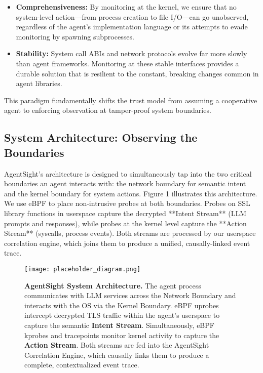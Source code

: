 \begin{itemize}
    \item \textbf{Comprehensiveness:} By monitoring at the kernel, we ensure that no system-level action—from process creation to file I/O—can go unobserved, regardless of the agent's implementation language or its attempts to evade monitoring by spawning subprocesses.
    \item \textbf{Stability:} System call ABIs and network protocols evolve far more slowly than agent frameworks. Monitoring at these stable interfaces provides a durable solution that is resilient to the constant, breaking changes common in agent libraries.
\end{itemize}
This paradigm fundamentally shifts the trust model from assuming a cooperative agent to enforcing observation at tamper-proof system boundaries.

\subsection{System Architecture: Observing the Boundaries}
AgentSight's architecture is designed to simultaneously tap into the two critical boundaries an agent interacts with: the network boundary for semantic intent and the kernel boundary for system actions. Figure 1 illustrates this architecture. We use eBPF to place non-intrusive probes at both boundaries. Probes on SSL library functions in userspace capture the decrypted **Intent Stream** (LLM prompts and responses), while probes at the kernel level capture the **Action Stream** (syscalls, process events). Both streams are processed by our userspace correlation engine, which joins them to produce a unified, causally-linked event trace.

\begin{figure}[h!]
    \centering
    \texttt{[image: placeholder\_diagram.png]} %
    \caption{\textbf{AgentSight System Architecture.} The agent process communicates with LLM services across the Network Boundary and interacts with the OS via the Kernel Boundary. eBPF uprobes intercept decrypted TLS traffic within the agent's userspace to capture the semantic \textbf{Intent Stream}. Simultaneously, eBPF kprobes and tracepoints monitor kernel activity to capture the \textbf{Action Stream}. Both streams are fed into the AgentSight Correlation Engine, which causally links them to produce a complete, contextualized event trace.}
    \label{fig:architecture}
\end{figure}

